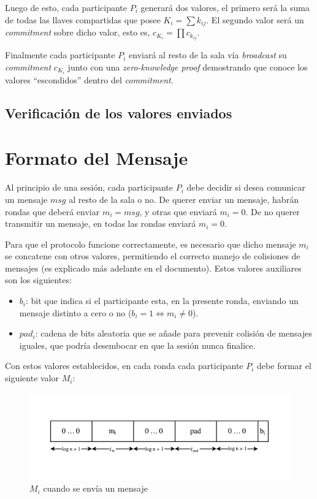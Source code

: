 Luego de esto, cada participante $P_i$ generará dos valores, el primero será 
la suma de todas las llaves compartidas que posee $K_i = \sum k_{ij}$. El 
segundo valor será un \emph{commitment} sobre dicho valor, esto es, 
$c_{K_i} = \prod c_{k_{ij}}$.

Finalmente cada participante $P_i$ enviará al resto de la sala vía 
\emph{broadcast} su \emph{commitment} $c_{K_i}$ junto con una 
\emph{zero-knowledge proof} demostrando que conoce los valores ``escondidos'' 
dentro del \emph{commitment}.

\subsection{Verificación de los valores enviados}


\section{Formato del Mensaje}

Al principio de una sesión, cada participante $P_i$ debe decidir si desea comunicar un mensaje $msg$ al resto de la sala o no. De querer enviar un mensaje, habrán rondas que deberá enviar $m_i = msg$, y otras que enviará $m_i = 0$. De no querer transmitir un mensaje, en todas las rondas enviará $m_i = 0$. 

Para que el protocolo funcione correctamente, es necesario que dicho mensaje $m_i$ se concatene con otros valores, permitiendo el correcto manejo de colisiones de mensajes (es explicado más adelante en el documento). Estos valores auxiliares son los siguientes:
\begin{itemize}
    \item $b_i$: bit que indica si el participante esta, en la presente ronda, enviando un mensaje distinto a cero o no ($b_i = 1 \iff m_i \neq 0$).
    \item $pad_i$: cadena de bits aleatoria que se añade para prevenir colisión de mensajes iguales, que podría desembocar en que la sesión nunca finalice.
\end{itemize}

Con estos valores establecidos, en cada ronda cada participante $P_i$ debe formar el siguiente valor $M_i$:

\begin{figure}
  \centering
    \includegraphics[width=1\textwidth]{imagenes/message-format(1).pdf}
  \caption{$M_i$ cuando se envía un mensaje}
\end{figure}


